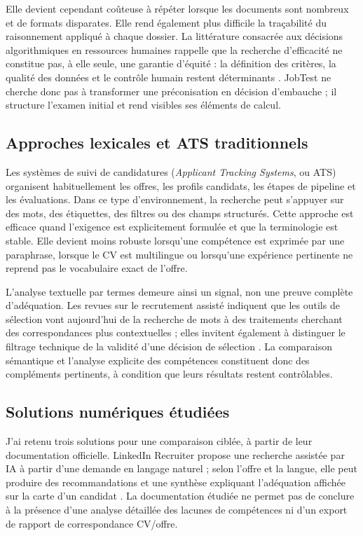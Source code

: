 Elle devient cependant coûteuse à répéter lorsque les documents sont nombreux et de formats disparates. Elle rend également plus difficile la traçabilité du raisonnement appliqué à chaque dossier. La littérature consacrée aux décisions algorithmiques en ressources humaines rappelle que la recherche d'efficacité ne constitue pas, à elle seule, une garantie d'équité : la définition des critères, la qualité des données et le contrôle humain restent déterminants \cite{koechling2020fairness}. JobTest ne cherche donc pas à transformer une préconisation en décision d'embauche ; il structure l'examen initial et rend visibles ses éléments de calcul.

\subsection{Approches lexicales et ATS traditionnels}
Les systèmes de suivi de candidatures (\textit{Applicant Tracking Systems}, ou ATS) organisent habituellement les offres, les profils candidats, les étapes de pipeline et les évaluations. Dans ce type d'environnement, la recherche peut s'appuyer sur des mots, des étiquettes, des filtres ou des champs structurés. Cette approche est efficace quand l'exigence est explicitement formulée et que la terminologie est stable. Elle devient moins robuste lorsqu'une compétence est exprimée par une paraphrase, lorsque le CV est multilingue ou lorsqu'une expérience pertinente ne reprend pas le vocabulaire exact de l'offre.

L'analyse textuelle par termes demeure ainsi un signal, non une preuve complète d'adéquation. Les revues sur le recrutement assisté indiquent que les outils de sélection vont aujourd'hui de la recherche de mots à des traitements cherchant des correspondances plus contextuelles ; elles invitent également à distinguer le filtrage technique de la validité d'une décision de sélection \cite{koechling2020fairness}. La comparaison sémantique et l'analyse explicite des compétences constituent donc des compléments pertinents, à condition que leurs résultats restent contrôlables.

\subsection{Solutions numériques étudiées}
J'ai retenu trois solutions pour une comparaison ciblée, à partir de leur documentation officielle. LinkedIn Recruiter propose une recherche assistée par IA à partir d'une demande en langage naturel ; selon l'offre et la langue, elle peut produire des recommandations et une synthèse expliquant l'adéquation affichée sur la carte d'un candidat \cite{linkedin_recruiter_search,linkedin_recruiter_ai}. La documentation étudiée ne permet pas de conclure à la présence d'une analyse détaillée des lacunes de compétences ni d'un export de rapport de correspondance CV/offre.

